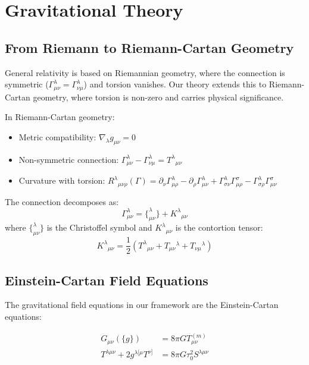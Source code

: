 \section{Gravitational Theory}
\label{sec:gravity}

\subsection{From Riemann to Riemann-Cartan Geometry}

General relativity is based on Riemannian geometry, where the connection is symmetric ($\Gamma^\lambda_{\mu\nu} = \Gamma^\lambda_{\nu\mu}$) and torsion vanishes. Our theory extends this to Riemann-Cartan geometry, where torsion is non-zero and carries physical significance.

In Riemann-Cartan geometry:
\begin{itemize}
    \item Metric compatibility: $\nabla_\lambda g_{\mu\nu} = 0$
    \item Non-symmetric connection: $\Gamma^\lambda_{\mu\nu} - \Gamma^\lambda_{\nu\mu} = T^\lambda{}_{\mu\nu}$
    \item Curvature with torsion: $R^\lambda{}_{\mu\nu\rho}(\Gamma) = \partial_\nu\Gamma^\lambda_{\mu\rho} - \partial_\rho\Gamma^\lambda_{\mu\nu} + \Gamma^\lambda_{\sigma\nu}\Gamma^\sigma_{\mu\rho} - \Gamma^\lambda_{\sigma\rho}\Gamma^\sigma_{\mu\nu}$
\end{itemize}

The connection decomposes as:
\begin{equation}
    \Gamma^\lambda_{\mu\nu} = \{^\lambda_{\mu\nu}\} + K^\lambda{}_{\mu\nu}
\end{equation}
where $\{^\lambda_{\mu\nu}\}$ is the Christoffel symbol and $K^\lambda{}_{\mu\nu}$ is the contortion tensor:
\begin{equation}
    K^\lambda{}_{\mu\nu} = \frac{1}{2}(T^\lambda{}_{\mu\nu} + T_{\mu\nu}{}^\lambda + T_{\nu\mu}{}^\lambda)
\end{equation}

\subsection{Einstein-Cartan Field Equations}

The gravitational field equations in our framework are the Einstein-Cartan equations:

\begin{align}
    G_{\mu\nu}(\{g\}) &= 8\pi G T^{(m)}_{\mu\nu} \\
    T^{\lambda\mu\nu} + 2g^{\lambda[\mu}T^{\nu]} &= 8\pi G \tau_0^2 S^{\lambda\mu\nu}
\end{align}

